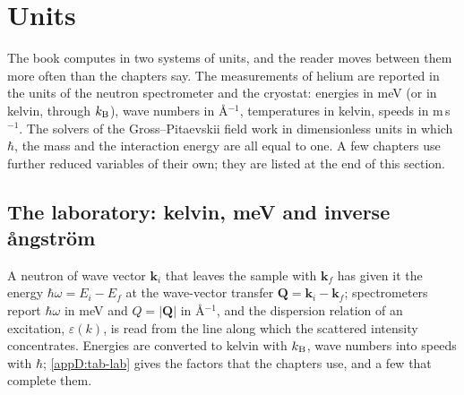 \section{Units}\label{appD:sec-units}

The book computes in two systems of units, and the reader moves between them more often than the chapters say.
The measurements of helium are reported in the units of the neutron spectrometer and the cryostat: energies in meV (or in kelvin, through $k_{\rm B}$), wave numbers in \AA$^{-1}$, temperatures in kelvin, speeds in m\,s$^{-1}$.
The solvers of the Gross--Pitaevskii field work in dimensionless units in which $\hbar$, the mass and the interaction energy are all equal to one.
A few chapters use further reduced variables of their own; they are listed at the end of this section.

\subsection{The laboratory: kelvin, meV and inverse ångström}\label{appD:sec-lab}

A neutron of wave vector $\mathbf k_i$ that leaves the sample with $\mathbf k_f$ has given it the energy $\hbar\omega=E_i-E_f$ at the wave-vector transfer $\mathbf Q=\mathbf k_i-\mathbf k_f$; spectrometers report $\hbar\omega$ in meV and $Q=|\mathbf Q|$ in \AA$^{-1}$, and the dispersion relation of an excitation, $\varepsilon(k)$, is read from the line along which the scattered intensity concentrates.
Energies are converted to kelvin with $k_{\rm B}$, wave numbers into speeds with $\hbar$; \cref{appD:tab-lab} gives the factors that the chapters use, and a few that complete them.
